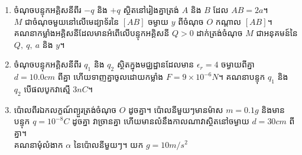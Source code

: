 \begin{enumerate}[m]
	\item ចំណុចបន្ទុកអគ្គិសនីពីរ $-q$ និង $+q$ ស្ថិតនៅរៀងគ្នាត្រង់ $A$ និង $B$ ដែល $AB=2a$។\\ $M$ ជាចំណុចមួយនៅលើមេដ្យាទ័រនៃ $[AB]$ ចម្ងាយ $y$ ពីចំណុច $O$ កណ្តាល $[AB]$។\\ គណនាកម្លាំងអគ្គិសនីដែលមានអំពើលើបន្ទុកអគ្គិសនី $Q>0$ ដាក់ត្រង់ចំណុច $M$ ជាអនុគមន៍នៃ $Q,~q,~a$ និង $y$។
	\item ចំណុចបន្ទុកអគ្គិសនីពីរ $q_{1}$ និង $q_{2}$ ស្ថិតក្នុងមជ្ឈដ្ឋានដែលមាន $\epsilon_{r}=4$ ចម្ងាយពីគ្នា $d=10.0cm$ ពីគ្នា ហើយទាញគ្នាចូលដោយកម្លាំង $F=9\times10^{-6}N$។ គណនាបន្ទុក $q_{1}$ និង $q_{2}$ បើផលបូកវាស្មើ $3nC$។
	\item ប៉ោលពីរឯកលក្ខណ៍ព្យួរត្រង់ចំណុច $O$ ដូចគ្នា។ ប៉ោលនីមួយៗមានម៉ាស $m=0.1g$ និងមានបន្ទុក $q=10^{-8}C$ ដូចគ្នា វាច្រានគ្នា ហើយមានលំនឹងកាលណាវាស្ថិតនៅចម្ងាយ $d=30cm$ ពីគ្នា។ \\ គណនាមុំលំងាក $\alpha$ នៃប៉ោលនីមួយៗ។ យក $g=10m/s^{2}$
	\end{enumerate}
\newpage
